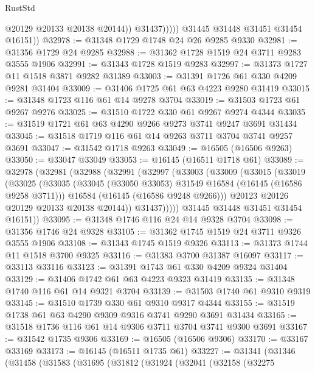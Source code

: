 \begin{lexlean}{RustStd}
\begin{coremodule}
                      @20129
                      @20133
                      @20138
                      @20144))
                  @31437)))))
        @31445
        @31448
        @31451
        @31454
        @16151))
@32978 := @31348 @1729 @1748 @24 @26 @9285 @9330
@32981 := @31356 @1729 @24 @9285
@32988 := @31362 @1728 @1519 @24 @3711 @9283 @3555 @1906
@32991 := @31343 @1728 @1519 @9283
@32997 := @31373 @1727 @11 @1518 @3871 @9282 @31389
@33003 := @31391 @1726 @61 @330 @4209 @9281 @31404
@33009 := @31406 @1725 @61 @63 @4223 @9280 @31419
@33015 := @31348 @1723 @116 @61 @14 @9278 @3704
@33019 := @31503 @1723 @61 @9267 @9276
@33025 := @31510 @1722 @330 @61 @9267 @9274 @4344
@33035 := @31519 @1721 @61 @63 @4290 @9266 @9273 @3741 @9247 @3691 @31434
@33045 := @31518 @1719 @116 @61 @14 @9263 @3711 @3704 @3741 @9257 @3691
@33047 := @31542 @1718 @9263
@33049 := @16505 (@16506 @9263)
@33050 := @33047 @33049
@33053 := @16145 (@16511 @1718 @61)
@33089 := @32978
    (@32981
      (@32988
        (@32991
          (@32997
            (@33003
              (@33009
                (@33015
                  (@33019
                    (@33025
                      (@33035
                        (@33045 (@33050 @33053) @31549 @16584 (@16145 (@16586 @9258 @3711)))
                        @16584
                        (@16145 (@16586 @9248 @9266)))
                      @20123
                      @20126
                      @20129
                      @20133
                      @20138
                      @20144))
                  @31437)))))
        @31445
        @31448
        @31451
        @31454
        @16151))
@33095 := @31348 @1746 @116 @24 @14 @9328 @3704
@33098 := @31356 @1746 @24 @9328
@33105 := @31362 @1745 @1519 @24 @3711 @9326 @3555 @1906
@33108 := @31343 @1745 @1519 @9326
@33113 := @31373 @1744 @11 @1518 @3700 @9325
@33116 := @31383 @3700 @31387 @16097
@33117 := @33113 @33116
@33123 := @31391 @1743 @61 @330 @4209 @9324 @31404
@33129 := @31406 @1742 @61 @63 @4223 @9323 @31419
@33135 := @31348 @1740 @116 @61 @14 @9321 @3704
@33139 := @31503 @1740 @61 @9310 @9319
@33145 := @31510 @1739 @330 @61 @9310 @9317 @4344
@33155 := @31519 @1738 @61 @63 @4290 @9309 @9316 @3741 @9290 @3691 @31434
@33165 := @31518 @1736 @116 @61 @14 @9306 @3711 @3704 @3741 @9300 @3691
@33167 := @31542 @1735 @9306
@33169 := @16505 (@16506 @9306)
@33170 := @33167 @33169
@33173 := @16145 (@16511 @1735 @61)
@33227 := @31341
    (@31346
      (@31458
        (@31583
          (@31695
            (@31812
              (@31924
                (@32041
                  (@32158
                    (@32275

\end{coremodule}
\end{lexlean}
